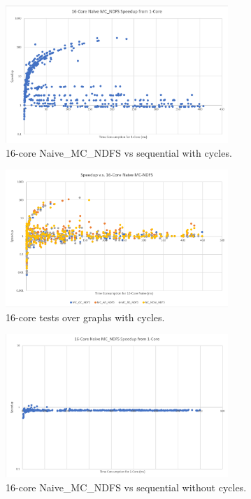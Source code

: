 \documentclass[a4paper]{article}
\begin{document}
\begin{figure}[ht]
\centering
\includegraphics[width=0.75\textwidth]{cycle1.PNG}
\caption{\label{fig:cycle1}16-core Naive\_MC\_NDFS vs sequential with cycles.}
\end{figure}

\begin{figure}
\centering
\includegraphics[width=0.75\textwidth]{cycle16.PNG}
\caption{\label{fig:cycle16}16-core tests over graphs with cycles.}
\end{figure}

\begin{figure}
\centering
\includegraphics[width=0.75\textwidth]{nocycle1.PNG}
\caption{\label{fig:nocycle1}16-core Naive\_MC\_NDFS vs sequential without cycles.}
\end{figure}
\end{document}
